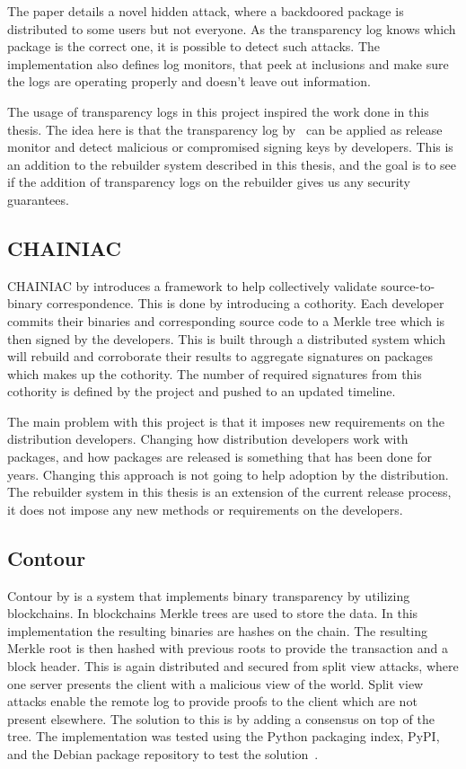 \documentclass[../Main/thesis.tex]{subfiles}
\begin{document}
The paper details a novel hidden attack, where a backdoored package is
distributed to some users but not everyone. As the transparency log knows which
package is the correct one, it is possible to detect such attacks. The
implementation also defines log monitors, that peek at inclusions and make
sure the logs are operating properly and doesn't leave out information.

The usage of transparency logs in this project inspired the work done in this
thesis. The idea here is that the transparency log by~\citeauthor{1711.07278v1}
can be applied as release monitor and detect malicious or compromised signing
keys by developers. This is an addition to the rebuilder system described in
this thesis, and the goal is to see if the addition of transparency logs on the
rebuilder gives us any security guarantees.


\subsection{CHAINIAC}\label{sec:chainiac}
CHAINIAC by \citeauthor*{kirill-niktin-2017} introduces a framework to help
collectively validate source-to-binary correspondence\cite{kirill-niktin-2017}.
This is done by introducing a cothority.  Each developer commits their binaries
and corresponding source code to a Merkle tree which is then signed by the
developers. This is built through a distributed system which will rebuild and
corroborate their results to aggregate signatures on packages which makes up the
cothority. The number of required signatures from this cothority is defined by
the project and pushed to an updated timeline.

The main problem with this project is that it imposes new requirements on the
distribution developers. Changing how distribution developers work with
packages, and how packages are released is something that has been done for
years. Changing this approach is not going to help adoption by the distribution.
The rebuilder system in this thesis is an extension of the current release
process, it does not impose any new methods or requirements on the developers.

\subsection{Contour}\label{sec:contour}
Contour by \citeauthor{1712.08427v2} is a system that implements binary
transparency by utilizing blockchains. In blockchains Merkle trees are used to
store the data. In this implementation the resulting binaries are hashes on the
chain. The resulting Merkle root is then hashed with previous roots to provide
the transaction and a block header. This is again distributed and secured from
split view attacks, where one server presents the client with a malicious view
of the world. Split view attacks enable the remote log to provide proofs to the
client which are not present elsewhere. The solution to this is by adding a
consensus on top of the tree. The implementation was tested using the Python
packaging index, PyPI, and the Debian package repository to test the
solution~\cite{1712.08427v2}.
\end{document}
